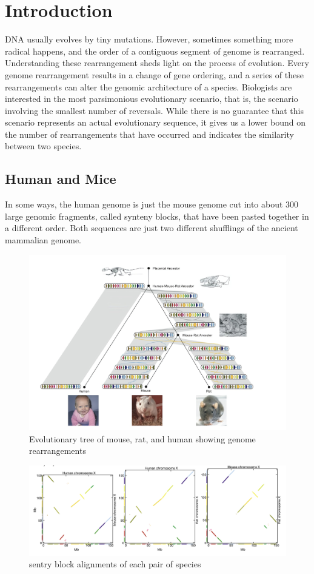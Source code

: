 
\section{Introduction}

DNA usually evolves by tiny mutations. However, sometimes something more radical happens, and the order of a contiguous segment of genome is rearranged. Understanding these rearrangement sheds light on the process of evolution. Every genome rearrangement results in a change of gene ordering, and a
series of these rearrangements can alter the genomic architecture of a species. Biologists are interested in the most parsimonious evolutionary scenario,
that is, the scenario involving the smallest number of reversals. While there is
no guarantee that this scenario represents an actual evolutionary sequence, it
gives us a lower bound on the number of rearrangements that have occurred
and indicates the similarity between two species.
\subsection{Human and Mice}

In some ways, the
human genome is just the mouse genome cut into about 300 large genomic
fragments, called synteny blocks, that have been pasted together in a different
order. Both sequences are just two different shufflings of the ancient mammalian genome. 

\begin{figure}[h] 
	\center 
	\includegraphics[width=0.7\linewidth]{assets/evolutionary_tree.jpg}
    \captionsetup{justification=centering, font=small}
	\caption{Evolutionary tree of mouse, rat, and human showing genome rearrangements\protect\footnotemark{}} 
\end{figure}

\begin{figure}[h] 
	\center 
	\includegraphics[width=0.7\linewidth]{assets/sentry_block.png}
    \captionsetup{justification=centering, font=small}
	\caption{sentry block alignments of each pair of species } 
\end{figure}



